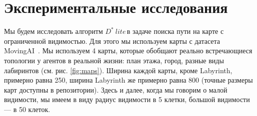 \documentclass[11pt]{article}
\newcommand{\dstarlite}{\(D^*\ lite\)\,}
\begin{document}
    \section{Экспериментальные исследования}

    Мы будем исследовать алгоритм \dstarlite в задаче поиска пути на карте с ограниченной видимостью.
    Для этого мы используем карты с датасета MovingAI~\cite{sturtevant2012benchmarks}.
    Мы используем 4 карты, которые обобщают реально встречающиеся топологии у агентов в реальной жизни: план этажа, город, разные виды лабиринтов (см. рис.  \ref{fig:maps}).
    Ширина каждой карты, кроме Labyrinth, примерно равна 250, ширина Labyrinth же примерно равна 800 (точные размеры карт доступны в репозитории).
    Здесь и далее, когда мы говорим о малой видимости, мы имеем в виду радиус видимости в 5 клетки, большой видимости --- в 50 клеток.
\end{document}
